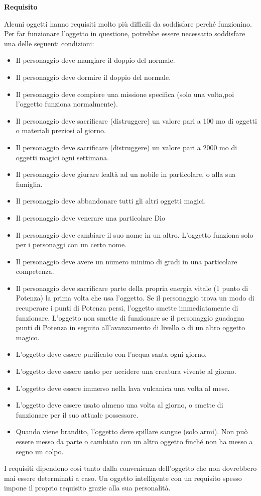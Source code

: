 \documentclass[a4paper,11pt,twoside,openany]{book}
\begin{document}
\bigskip

\textbf{Requisito}

Alcuni oggetti hanno requisiti molto più difficili da soddisfare perché funzionino. Per far funzionare l'oggetto in questione, potrebbe essere necessario soddisfare una delle seguenti condizioni:
\begin{itemize}
	\item Il personaggio deve mangiare il doppio del normale.
	\item Il personaggio deve dormire il doppio del normale.
	\item Il personaggio deve compiere una missione specifica (solo una volta,poi l'oggetto funziona normalmente).
	\item Il personaggio deve sacrificare (distruggere) un valore pari a 100 mo di oggetti o materiali preziosi al giorno.
	\item Il personaggio deve sacrificare (distruggere) un valore pari a 2000 mo di oggetti magici ogni settimana.
	\item Il personaggio deve giurare lealtà ad un nobile in particolare, o alla sua famiglia.
	\item Il personaggio deve abbandonare tutti gli altri oggetti magici.
	\item Il personaggio deve venerare una particolare Dio
	\item Il personaggio deve cambiare il suo nome in un altro. L'oggetto funziona solo per i personaggi con un certo nome.
	\item Il personaggio deve avere un numero minimo di gradi in una particolare competenza.
	\item Il personaggio deve sacrificare parte della propria energia vitale (1 punto di Potenza) la prima volta che usa l'oggetto. Se il personaggio trova un modo di recuperare i punti di Potenza persi, l'oggetto smette immediatamente di funzionare. L'oggetto non smette di funzionare se il personaggio guadagna punti di Potenza in seguito all'avanzamento di livello o di un altro oggetto magico.
	\item L'oggetto deve essere purificato con l'acqua santa ogni giorno.
	\item L'oggetto deve essere usato per uccidere una creatura vivente al giorno.
	\item L'oggetto deve essere immerso nella lava vulcanica una volta al mese.
	\item L'oggetto deve essere usato almeno una volta al giorno, o smette di funzionare per il suo attuale possessore.
	\item Quando viene brandito, l'oggetto deve spillare sangue (solo armi). Non può essere messo da parte o cambiato con un altro oggetto finché non ha messo a segno un colpo.
\end{itemize}
I requisiti dipendono così tanto dalla convenienza dell'oggetto che non dovrebbero mai essere determinati a caso. Un oggetto intelligente con un requisito spesso impone il proprio requisito grazie alla sua personalità.
\end{document}
